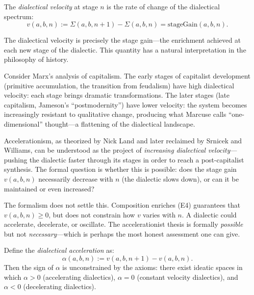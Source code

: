 \begin{definition}
\label{def:dialectical-velocity}
The \emph{dialectical velocity} at stage $n$ is the rate of change of the
dialectical spectrum:
\[
v(a, b, n) := \Sigma(a, b, n+1) - \Sigma(a, b, n) = \mathrm{stageGain}(a, b, n).
\]
\end{definition}

\begin{interpretation}
The dialectical velocity is precisely the stage gain---the enrichment achieved
at each new stage of the dialectic. This quantity has a natural interpretation
in the philosophy of history.

Consider Marx's analysis of capitalism. The early stages of capitalist
development (primitive accumulation, the transition from feudalism) have
high dialectical velocity: each stage brings dramatic transformations.
The later stages (late capitalism, Jameson's ``postmodernity'') have lower
velocity: the system becomes increasingly resistant to qualitative change,
producing what Marcuse calls ``one-dimensional'' thought---a flattening of the
dialectical landscape.

Accelerationism, as theorized by Nick Land and later reclaimed by Srnicek
and Williams, can be understood as the project of \emph{increasing dialectical
velocity}---pushing the dialectic faster through its stages in order to reach
a post-capitalist synthesis. The formal question is whether this is possible:
does the stage gain $v(a,b,n)$ necessarily decrease with $n$ (the dialectic
slows down), or can it be maintained or even increased?

The formalism does not settle this. Composition enriches (E4) guarantees that
$v(a,b,n) \geq 0$, but does not constrain how $v$ varies with $n$. A dialectic
could accelerate, decelerate, or oscillate. The accelerationist thesis is
formally \emph{possible} but not \emph{necessary}---which is perhaps the most
honest assessment one can give.
\end{interpretation}

\begin{theorem}
\label{thm:dialectical-acceleration}
Define the \emph{dialectical acceleration} as:
\[
\alpha(a,b,n) := v(a,b,n+1) - v(a,b,n).
\]
Then the sign of $\alpha$ is unconstrained by the axioms: there exist ideatic
spaces in which $\alpha > 0$ (accelerating dialectics), $\alpha = 0$ (constant
velocity dialectics), and $\alpha < 0$ (decelerating dialectics).
\end{theorem}

